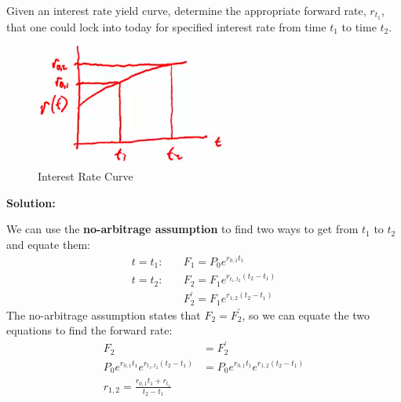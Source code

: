 \begin{example}
    Given an interest rate yield curve, determine the appropriate forward rate, $r_{t_1}$, that one could lock into today for specified interest rate from time $t_1$ to time $t_2$.\\
    \begin{figure}[h!]
        \centering
        \includegraphics[width=0.6\textwidth]{LECTURE_4/interest-rate-curve.png}
        \caption{Interest Rate Curve}
        \label{fig:interest_rate_curve}
    \end{figure}

    \textbf{Solution:}

    We can use the \textbf{no-arbitrage assumption} to find two ways to get from $t_1$ to $t_2$ and equate them:
    \begin{align*}
        t = t_1 : \quad & F_1 = P_0e^{r_{0,1}t_1}                 \\
        t = t_2 : \quad & F_2 = F_1e^{r_{t_1,t_2}(t_2-t_1)}       \\
                        & F_2^{\prime} = F_1 e^{r_{1,2}(t_2-t_1)}
    \end{align*}
    The no-arbitrage assumption states that $F_2 = F_2^{\prime}$, so we can equate the two equations to find the forward rate:
    \begin{align*}
        F_2                                       & = F_2^{\prime}                          \\
        P_0e^{r_{0,1}t_1}e^{r_{t_1,t_2}(t_2-t_1)} & = P_0e^{r_{0,1}t_1}e^{r_{1,2}(t_2-t_1)} \\
        r_{1,2} = \frac{r_{0,1}t_1 + r_{t_1}}{t_2 - t_1}
    \end{align*}
\end{example}

